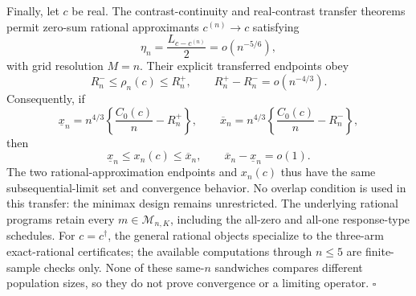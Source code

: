 Finally, let \(c\) be real. The contrast-continuity and real-contrast transfer theorems permit zero-sum rational approximants \(c^{(n)}\to c\) satisfying
\[
 \eta_n=\frac{L_{c-c^{(n)}}}{2}=o(n^{-5/6}),
\]
with grid resolution \(M=n\). Their explicit transferred endpoints obey
\[
 R_n^-\leq\rho_n(c)\leq R_n^+,
 \qquad
 R_n^+-R_n^-=o(n^{-4/3}).
\]
Consequently, if
\[
 \underline x_n=n^{4/3}\left\{\frac{C_0(c)}n-R_n^+\right\},
 \qquad
 \overline x_n=n^{4/3}\left\{\frac{C_0(c)}n-R_n^-\right\},
\]
then
\[
 \underline x_n\leq x_n(c)\leq\overline x_n,
 \qquad
 \overline x_n-\underline x_n=o(1).
\]
The two rational-approximation endpoints and \(x_n(c)\) thus have the same subsequential-limit set and convergence behavior. No overlap condition is used in this transfer: the minimax design remains unrestricted. The underlying rational programs retain every \(m\in\mathcal M_{n,K}\), including the all-zero and all-one response-type schedules. For \(c=c^\dagger\), the general rational objects specialize to the three-arm exact-rational certificates; the available computations through \(n\leq5\) are finite-sample checks only. None of these same-\(n\) sandwiches compares different population sizes, so they do not prove convergence or a limiting operator. \(\square\)